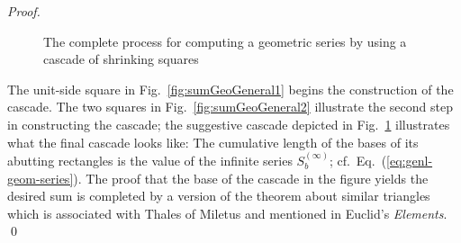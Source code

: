 \begin{proof}
\begin{figure}[ht]
\begin{center}
\caption{The complete process for computing a geometric series by using a cascade of shrinking squares}
       \label{fig:sumGeoGeneral3}
\end{center}
\end{figure}
The unit-side square in Fig.~\ref{fig:sumGeoGeneral1} begins the construction of the cascade.  The two squares in Fig.~\ref{fig:sumGeoGeneral2} illustrate the second step in constructing the cascade; the suggestive cascade depicted in Fig.~\ref{fig:sumGeoGeneral3} illustrates what the final cascade looks like: The cumulative length of the bases of its abutting rectangles is the value of the infinite series $S_b^{(\infty)}$; cf.~Eq.~(\ref{eq:genl-geom-series}).  The proof that the base of the cascade in the figure yields the desired sum is completed by a version of the theorem about similar triangles which is associated with Thales of Miletus and mentioned in Euclid's {\it Elements}.  \qed
\end{proof}
 

\medskip

\noindent {}

